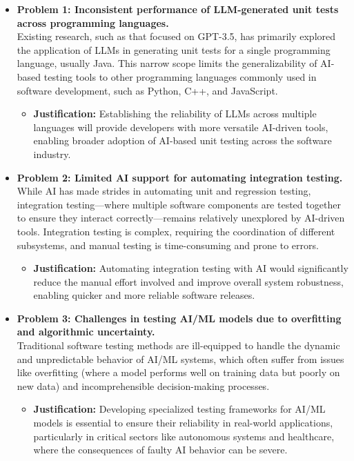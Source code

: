 \documentclass[12pt,a4paper]{article}
\begin{document}
\begin{itemize}
    \item \textbf{Problem 1: Inconsistent performance of LLM-generated unit tests across programming languages.} \\
     Existing research, such as that focused on GPT-3.5, has primarily explored the application of LLMs in generating unit tests for a single programming language, usually Java. This narrow scope limits the generalizability of AI-based testing tools to other programming languages commonly used in software development, such as Python, C++, and JavaScript.
    \begin{itemize}
    \item \textbf{Justification:} Establishing the reliability of LLMs across multiple languages will provide developers with more versatile AI-driven tools, enabling broader adoption of AI-based unit testing across the software industry.
    \end{itemize}
 
    \item \textbf{Problem 2: Limited AI support for automating integration testing. }\\
    While AI has made strides in automating unit and regression testing, integration testing—where multiple software components are tested together to ensure they interact correctly—remains relatively unexplored by AI-driven tools. Integration testing is complex, requiring the coordination of different subsystems, and manual testing is time-consuming and prone to errors.
    \begin{itemize}
    \item \textbf{Justification:} Automating integration testing with AI would significantly reduce the manual effort involved and improve overall system robustness, enabling quicker and more reliable software releases.
    \end{itemize}

    \item \textbf{Problem 3: Challenges in testing AI/ML models due to overfitting and algorithmic uncertainty. }\\
    Traditional software testing methods are ill-equipped to handle the dynamic and unpredictable behavior of AI/ML systems, which often suffer from issues like overfitting (where a model performs well on training data but poorly on new data) and incomprehensible decision-making processes.
    \begin{itemize}
    \item \textbf{Justification:} Developing specialized testing frameworks for AI/ML models is essential to ensure their reliability in real-world applications, particularly in critical sectors like autonomous systems and healthcare, where the consequences of faulty AI behavior can be severe.

    \end{itemize}
    
\end{itemize}
\end{document}
